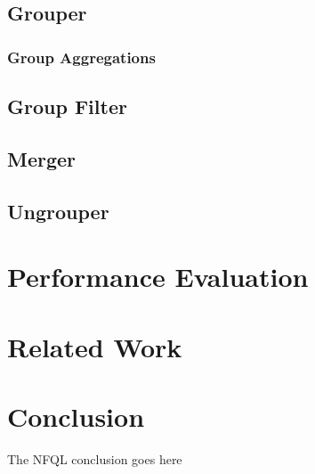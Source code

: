 \documentclass[conference]{IEEEtran}
\begin{document}
  \subsection{Grouper}
  \subsubsection{Group Aggregations}
  \subsection{Group Filter}
  \subsection{Merger}
  \subsection{Ungrouper}

\section{Performance Evaluation}
\section{Related Work}
\section{Conclusion}
The \ac{NFQL} conclusion goes here \cite{vmarinov:2009}





\begin{acronym}[NFQL]
\end{acronym}
\end{document}
